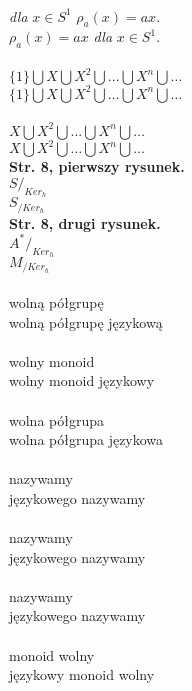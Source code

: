 \documentclass[a4paper,11pt]{article}
\begin{document}
\noindent
{} \\
\Jest  \textit{dla} $x \in S^{ 1 }$ $\rho_{ a }( x )= a x$. \\
\Powin $\rho_{ a }( x ) = a x$ \textit{dla} $x \in S^{ 1 }$. \\
 \\
\Jest  $\{ 1 \} \bigcup X \bigcup X^{ 2 } \bigcup ... \bigcup X^{ n } \bigcup \ldots$ \\
\Powin $\{ 1 \} \bigcup X \bigcup X^{ 2 } \bigcup \ldots \bigcup X^{ n } \bigcup \ldots$ \\
 \\
\Jest  $X \bigcup X^{ 2 } \bigcup ... \bigcup X^{ n } \bigcup \ldots$ \\
\Powin $X \bigcup X^{ 2 } \bigcup \ldots \bigcup X^{ n } \bigcup \ldots$ \\
\textbf{Str. 8, pierwszy rysunek.} \\
\Jest  $S /_{ Ker_{ h } }$ \\
\Powin $S_{ / Ker_{ h } }$ \\
\textbf{Str. 8, drugi rysunek.} \\
\Jest  $A^{ * } /_{ Ker_{ h } }$ \\
\Powin $M_{ / Ker_{ h } }$ \\
 \\
\Jest  wolną półgrupę \\
\Powin wolną półgrupę językową \\
 \\
\Jest  wolny monoid \\
\Powin wolny monoid językowy \\
 \\
\Jest  wolna półgrupa \\
\Powin wolna półgrupa językowa \\
 \\
\Jest  nazywamy \\
\Powin językowego nazywamy \\
 \\
\Jest  nazywamy \\
\Powin językowego nazywamy \\
 \\
\Jest  nazywamy \\
\Powin językowego nazywamy \\
 \\
\Jest  monoid wolny \\
\Powin językowy monoid wolny \\
\end{document}
